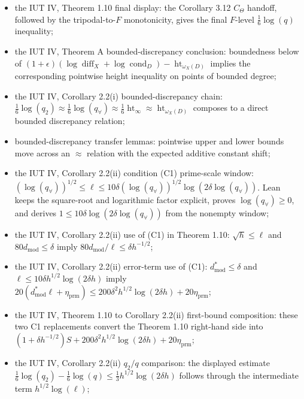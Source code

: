 \documentclass[11pt]{article}
\begin{document}
\begin{itemize}
  \(2\log(\ell)+74\) and the prime-product term into
  \(10(e^*_{\mathrm{mod}}\ell+\eta_{\mathrm{prm}})\);
\item the IUT IV, Theorem 1.10 final display:
  the Corollary 3.12 \(C_\Theta\) handoff, followed by the
  tripodal-to-\(F\) monotonicity, gives the final \(F\)-level
  \(\frac16\log(q)\) inequality;
\item the IUT IV, Theorem A bounded-discrepancy conclusion:
  boundedness below of
  \((1+\epsilon)(\log\operatorname{diff}_X+\log\operatorname{cond}_D)
   -\operatorname{ht}_{\omega_X(D)}\) implies the corresponding pointwise height
  inequality on points of bounded degree;
\item the IUT IV, Corollary 2.2(i) bounded-discrepancy chain:
  \(\frac16\log(q_2)\approx\frac16\log(q_\forall)
   \approx\frac16\operatorname{ht}_\infty
   \approx\operatorname{ht}_{\omega_X(D)}\) composes to a direct bounded
  discrepancy relation;
\item bounded-discrepancy transfer lemmas: pointwise upper and lower bounds move
  across an \(\approx\) relation with the expected additive constant shift;
\item the IUT IV, Corollary 2.2(ii) condition (C1) prime-scale window:
  \((\log(q_\forall))^{1/2}\le\ell\le
   10\delta(\log(q_\forall))^{1/2}\log(2\delta\log(q_\forall))\).  Lean keeps
  the square-root and logarithmic factor explicit, proves
  \(\log(q_\forall)\ge0\), and derives
  \(1\le10\delta\log(2\delta\log(q_\forall))\) from the nonempty window;
\item the IUT IV, Corollary 2.2(ii) use of (C1) in Theorem 1.10:
  \(\sqrt h\le\ell\) and \(80d_{\mathrm{mod}}\le\delta\) imply
  \(80d_{\mathrm{mod}}/\ell\le\delta h^{-1/2}\);
\item the IUT IV, Corollary 2.2(ii) error-term use of (C1):
  \(d^*_{\mathrm{mod}}\le\delta\) and
  \(\ell\le10\delta h^{1/2}\log(2\delta h)\) imply
  \(20(d^*_{\mathrm{mod}}\ell+\eta_{\mathrm{prm}})
   \le200\delta^2h^{1/2}\log(2\delta h)+20\eta_{\mathrm{prm}}\);
\item the IUT IV, Theorem 1.10 to Corollary 2.2(ii) first-bound composition:
  these two C1 replacements convert the Theorem 1.10 right-hand side into
  \((1+\delta h^{-1/2})S+
    200\delta^2h^{1/2}\log(2\delta h)+20\eta_{\mathrm{prm}}\);
\item the IUT IV, Corollary 2.2(ii) \(q_2/q\) comparison:
  the displayed estimate
  \(\frac16\log(q_2)-\frac16\log(q)
   \le\frac13h^{1/2}\log(2\delta h)\) follows through the intermediate
  term \(h^{1/2}\log(\ell)\);

\end{itemize}
\end{document}
